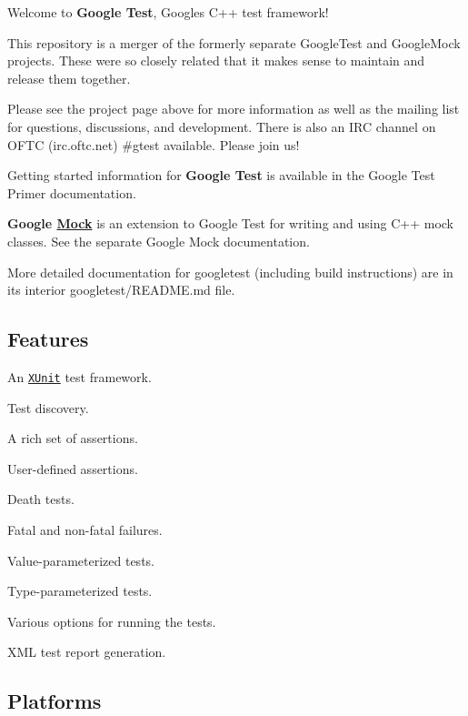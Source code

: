 \href{https://travis-ci.org/google/googletest}{\tt } \href{https://ci.appveyor.com/project/BillyDonahue/googletest/branch/master}{\tt }

Welcome to {\bfseries Google Test}, Google\textquotesingle{}s C++ test framework!

This repository is a merger of the formerly separate Google\+Test and Google\+Mock projects. These were so closely related that it makes sense to maintain and release them together.

Please see the project page above for more information as well as the mailing list for questions, discussions, and development. There is also an I\+RC channel on O\+F\+TC (irc.\+oftc.\+net) \#gtest available. Please join us!

Getting started information for {\bfseries Google Test} is available in the Google Test Primer documentation.

{\bfseries Google \hyperlink{class_mock}{Mock}} is an extension to Google Test for writing and using C++ mock classes. See the separate Google Mock documentation.

More detailed documentation for googletest (including build instructions) are in its interior googletest/\+R\+E\+A\+D\+ME.md file.

\subsection*{Features}


\begin{DoxyItemize}
\item An \href{https://en.wikipedia.org/wiki/XUnit}{\tt X\+Unit} test framework.
\item Test discovery.
\item A rich set of assertions.
\item User-\/defined assertions.
\item Death tests.
\item Fatal and non-\/fatal failures.
\item Value-\/parameterized tests.
\item Type-\/parameterized tests.
\item Various options for running the tests.
\item X\+ML test report generation.
\end{DoxyItemize}

\subsection*{Platforms}

